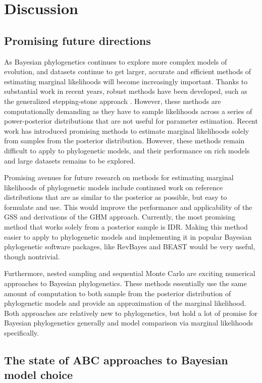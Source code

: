 \section{Discussion}

\subsection{Promising future directions}

As Bayesian phylogenetics continues to explore more complex models of
evolution, and datasets continue to get larger, accurate and efficient methods
of estimating marginal likelihoods will become increasingly important.
Thanks to substantial work in recent years, robust methods have been developed,
such as the generalized stepping-stone approach \citep{Fan2011}.
However, these methods are computationally demanding as they have to sample
likelihoods across a series of power-posterior distributions that are not
useful for parameter estimation.
Recent work has introduced promising methods to estimate marginal likelihoods
solely from samples from the posterior distribution.
However, these methods remain difficult to apply to phylogenetic models, and
their performance on rich models and large datasets remains to be explored.

Promising avenues for future research on methods for estimating marginal
likelihoods of phylogenetic models include continued work on reference
distributions that are as similar to the posterior as possible, but easy to
formulate and use.
This would improve the performance and applicability of the GSS and derivations
of the GHM approach.
Currently, the most promising method that works solely from a posterior
sample is IDR.
Making this method easier to apply to phylogenetic models and implementing
it in popular Bayesian phylogenetic software packages,
like
RevBayes \citep{Hohna2016}
and
BEAST \citep{Suchard2018,Bouckaert2014}
would be very useful, though nontrivial.

Furthermore, nested sampling and sequential Monte Carlo are exciting numerical
approaches to Bayesian phylogenetics.
These methods essentially use the same amount of computation to both sample
from the posterior distribution of phylogenetic models and provide an
approximation of the marginal likelihood.
Both approaches are relatively new to phylogenetics, but hold a lot of promise
for Bayesian phylogenetics generally and model comparison via marginal
likelihoods specifically.


\subsection{The state of ABC approaches to Bayesian model choice}

